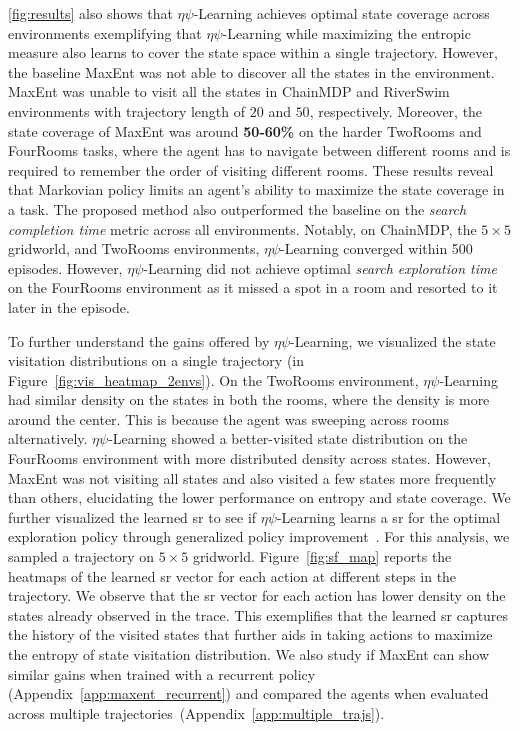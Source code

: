 \documentclass{article}
\theoremstyle{plain}
\theoremstyle{definition}
\theoremstyle{remark}
\newcommand{\alg}{$\eta$$\psi$-Learning}
\begin{document}
\autoref{fig:results} also shows that \alg{} achieves optimal state coverage across environments exemplifying that \alg{} while maximizing the entropic measure also learns to cover the state space within a single trajectory. 
However, the baseline MaxEnt was not able to discover all the states in the environment.
MaxEnt was unable to visit all the states in ChainMDP and RiverSwim environments with trajectory length of $20$ and $50$, respectively.
Moreover, the state coverage of MaxEnt was around \textbf{50-60\%} on the harder TwoRooms and FourRooms tasks, where the agent has to navigate between different rooms and is required to remember the order of visiting different rooms.
These results reveal that Markovian policy limits an agent's ability to maximize the state coverage in a task. 
The proposed method also outperformed the baseline on the \textit{search completion time} metric across all environments.
Notably, on ChainMDP, the $5 \times 5$ gridworld, and TwoRooms environments, \alg{} converged within 500 episodes. 
However, \alg{} did not achieve optimal \textit{search exploration time} on the FourRooms environment as it missed a spot in a room and resorted to it later in the episode.

To further understand the gains offered by \alg{}, we visualized the state visitation distributions on a single trajectory (in Figure~\ref{fig:vis_heatmap_2envs}).
On the TwoRooms environment, \alg{} had similar density on the states in both the rooms, where the density is more around the center.
This is because the agent was sweeping across rooms alternatively. 
\alg{} showed a better-visited state distribution on the FourRooms environment with more distributed density across states.
However, MaxEnt was not visiting all states and also visited a few states more frequently than others, elucidating the lower performance on entropy and state coverage.
We further visualized the learned \gls{sr} to see if \alg{} learns a \gls{sr} for the optimal exploration policy through generalized policy improvement~\cite{barreto2017successor}.
For this analysis, we sampled a trajectory on $5\times5$ gridworld.
Figure~\ref{fig:sf_map} reports the heatmaps of the learned \gls{sr} vector for each action at different steps in the trajectory.
We observe that the \gls{sr} vector for each action has lower density on the states already observed in the trace.
This exemplifies that the learned \gls{sr} captures the history of the visited states that further aids in taking actions to maximize the entropy of state visitation distribution. 
We also study if MaxEnt can show similar gains when trained with a recurrent policy (Appendix~\ref{app:maxent_recurrent}) and compared the agents when evaluated across multiple trajectories~(Appendix~\ref{app:multiple_trajs}). 
\end{document}
